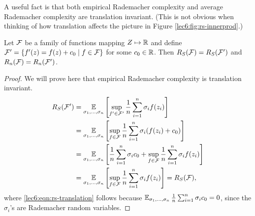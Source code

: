 A useful fact is that both empirical Rademacher complexity and average Rademacher complexity are translation invariant. (This is not obvious when thinking of how translation affects the picture in Figure \ref{lec6:fig:rs-innerprod}.)

\begin{proposition}
Let $\mathcal F$ be a family of functions mapping $Z \mapsto \mathbb R$ and define $\mathcal F' = \{f'(z) = f(z) + c_0\mid f\in \mathcal F\}$ for some $c_0\in\mathbb R$. Then $R_S(\mathcal F) = R_S(\mathcal F')$ and $R_n(\mathcal F) = R_n(\mathcal F')$.
\end{proposition}

\begin{proof}
We will prove here that empirical Rademacher complexity is translation invariant.
\begin{align}
R_S(\mathcal F') &= \operatorname*{\mathbb{E}}_{\sigma_1,\dots, \sigma_n} \left[ \sup_{f'\in \mathcal F'} \frac{1}{n} \sum^n_{i=1} \sigma_i f(z_i) \right] \\
&= \operatorname*{\mathbb{E}}_{\sigma_1,\dots, \sigma_n} \left[ \sup_{f\in \mathcal F} \frac{1}{n} \sum^n_{i=1} \sigma_i (f(z_i)+c_0) \right] \\
&= \operatorname*{\mathbb{E}}_{\sigma_1,\dots, \sigma_n} \left[ \frac{1}{n} \sum^n_{i=1} \sigma_i c_0 + \sup_{f\in \mathcal F} \frac{1}{n} \sum^n_{i=1} \sigma_i f(z_i) \right] \\
&= \operatorname*{\mathbb{E}}_{\sigma_1,\dots, \sigma_n} \left[\sup_{f\in \mathcal F} \frac{1}{n} \sum^n_{i=1} \sigma_i f(z_i) \right] = R_S(\mathcal F), \label{lec6:eqn:rs-translation}
\end{align}
where \eqref{lec6:eqn:rs-translation} follows because $\operatorname*{\mathbb{E}}_{\sigma_1,\dots,\sigma_n} \frac{1}{n}\sum_{i=1}^n \sigma_i c_0 = 0$, since the $\sigma_i$'s are Rademacher random variables.
\end{proof}

